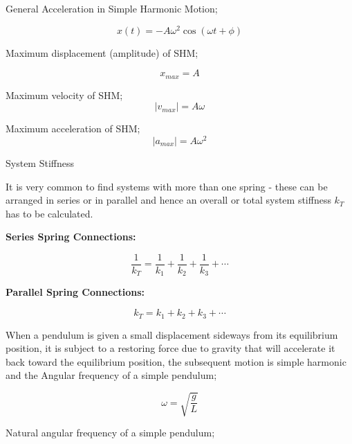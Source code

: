\documentclass[12pt, letterpaper, twoside]{article}
\begin{document}
General Acceleration in Simple Harmonic Motion;

\begin{equation}
x(t)  = -A \omega^2 \cos (\omega t + \phi)
\end{equation}



Maximum displacement (amplitude) of SHM;

\begin{equation}
x_{max} = A
\end{equation}



Maximum velocity of SHM;
\begin{equation}
|v_{max}| = A \omega
\end{equation}



Maximum acceleration of SHM;
\begin{equation}
|a_{max}| = A \omega^2 
\end{equation}

System Stiffness

It is very common to find systems with more than one spring - these can be arranged in series or in parallel and hence an overall or total system stiffness $k_T$  has to be calculated.

\textbf{Series Spring Connections:}

\begin{equation}
\frac{1}{k_T} = \frac{1}{k_1} + \frac{1}{k_2} + \frac{1}{k_3} + \cdots
\end{equation}


\textbf{Parallel Spring Connections:}

\begin{equation}
{k_T} = {k_1} + {k_2} + {k_3} + \cdots
\end{equation}



\bigskip

When a pendulum is given a small displacement sideways from its equilibrium position, it is subject to a restoring force due to gravity that will accelerate it back toward the equilibrium position, the subsequent motion is simple harmonic and the Angular frequency of a simple pendulum;

\begin{equation}
\omega = \sqrt{\frac{g}{L}}
\end{equation}


Natural angular frequency of a simple pendulum;
\end{document}
